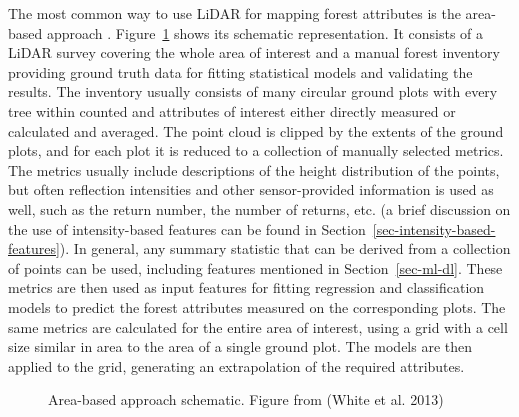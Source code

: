 The most common way to use LiDAR for mapping forest attributes is the area-based approach \cite{whiteABAGuide2013}.
Figure~\ref{fig-aba-schema} shows its schematic representation.
It consists of a LiDAR survey covering the whole area of interest and a manual forest inventory providing ground truth data for fitting statistical models and validating the results.
The inventory usually consists of many circular ground plots with every tree within counted and attributes of interest either directly measured or calculated and averaged.
The point cloud is clipped by the extents of the ground plots, and for each plot it is reduced to a collection of manually selected metrics.
The metrics usually include descriptions of the height distribution of the points, but often reflection intensities and other sensor-provided information is used as well, such as the return number, the number of returns, etc. (a brief discussion on the use of intensity-based features can be found in Section~\ref{sec-intensity-based-features}).
In general, any summary statistic that can be derived from a collection of points can be used, including features mentioned in Section~\ref{sec-ml-dl}.
These metrics are then used as input features for fitting regression and classification models to predict the forest attributes measured on the corresponding plots.
The same metrics are calculated for the entire area of interest, using a grid with a cell size similar in area to the area of a single ground plot.
The models are then applied to the grid, generating an extrapolation of the required attributes.

\begin{figure}
\caption{\label{fig-aba-schema}Area-based approach schematic. Figure
from (White et al. 2013)}
\end{figure}

